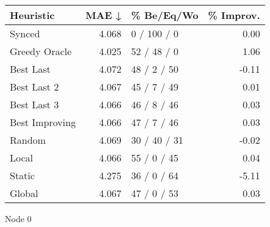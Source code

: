 \begin{tabular}{lrlr}
\toprule
\textbf{Heuristic} & \textbf{MAE ↓} & \textbf{\% Be/Eq/Wo} & \textbf{\% Improv.} \\
\midrule
            Synced &          4.068 &          0 / 100 / 0 &                0.00 \\
     Greedy Oracle &          4.025 &          52 / 48 / 0 &                1.06 \\
         Best Last &          4.072 &          48 / 2 / 50 &               -0.11 \\
       Best Last 2 &          4.067 &          45 / 7 / 49 &                0.01 \\
       Best Last 3 &          4.066 &          46 / 8 / 46 &                0.03 \\
    Best Improving &          4.066 &          47 / 7 / 46 &                0.03 \\
            Random &          4.069 &         30 / 40 / 31 &               -0.02 \\
             Local &          4.066 &          55 / 0 / 45 &                0.04 \\
            Static &          4.275 &          36 / 0 / 64 &               -5.11 \\
            Global &          4.067 &          47 / 0 / 53 &                0.03 \\
\bottomrule
\end{tabular}
\caption{Node 0}
\label{tab:hr_non_lr01_le1_bs2_0}
